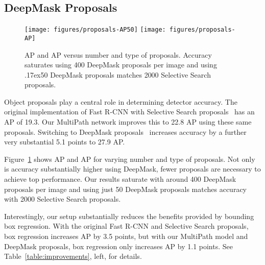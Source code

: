 \documentclass{bmvc2k}
\newcommand{\app}{\raise.17ex\hbox{}}
\newcommand{\Caption}[1]{\caption{\small#1}}
\newcommand{\AP}[1]{AP\xspace}
\newcommand{\fig}[1]{Figure~\ref{fig:#1}}
\newcommand{\tab}[1]{Table~\ref{table:#1}}
\begin{document}
\subsection{DeepMask Proposals}\label{sec:results:deepmask}

\begin{figure}[t]\centering
 \texttt{[image: figures/proposals-AP50]}
 \texttt{[image: figures/proposals-AP]}
\Caption{\AP{50} and AP versus number and type of proposals. Accuracy saturates using 400 DeepMask proposals per image and using \app50 DeepMask proposals matches 2000 Selective Search proposals.}
\label{fig:proposals}
\end{figure}


Object proposals play a central role in determining detector accuracy. The original implementation of Fast R-CNN with Selective Search proposals~\cite{Uijlings13} has an AP of 19.3. Our MultiPath network improves this to 22.8 AP using these same proposals. Switching to DeepMask proposals~\cite{pinheiro2015learning, pinheiro2016refining} increases accuracy by a further very substantial 5.1 points to 27.9 AP.

\fig{proposals} shows \AP{50} and AP for varying number and type of proposals. Not only is accuracy substantially higher using DeepMask, fewer proposals are necessary to achieve top performance. Our results saturate with around 400 DeepMask proposals per image and using just 50 DeepMask proposals matches accuracy with 2000 Selective Search proposals.

Interestingly, our setup substantially reduces the benefits provided by bounding box regression. With the original Fast R-CNN and Selective Search proposals, box regression increases AP by 3.5 points, but with our MultiPath model and DeepMask proposals, box regression only increases AP by 1.1 points. See \tab{improvements}, left, for details.
\end{document}

